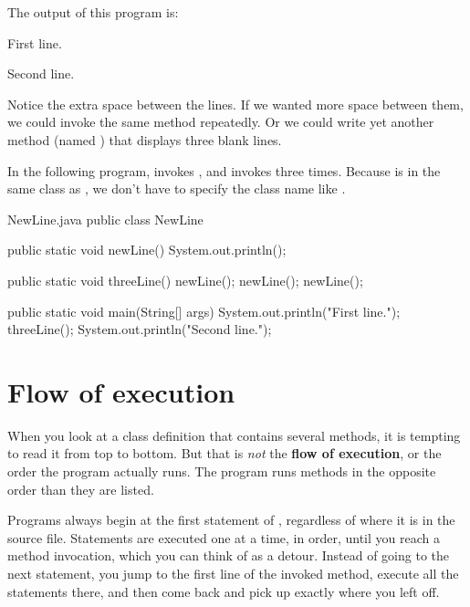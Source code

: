 The output of this program is:

\begin{stdout}
First line.

Second line.
\end{stdout}

Notice the extra space between the lines.
If we wanted more space between them, we could invoke the same method repeatedly.
Or we could write yet another method (named ) that displays three blank lines.

In the following program,  invokes , and  invokes  three times.
Because  is in the same class as , we don't have to specify the class name like .

\begin{trinket} [320]{NewLine.java}
public class NewLine {

    public static void newLine() {
        System.out.println();
    }

    public static void threeLine() {
        newLine();
        newLine();
        newLine();
    }

    public static void main(String[] args) {
        System.out.println("First line.");
        threeLine();
        System.out.println("Second line.");
    }
}
\end{trinket}


\section{Flow of execution}


When you look at a class definition that contains several methods, it is tempting to read it from top to bottom.
But that is {\em not} the {\bf flow of execution}, or the order the program actually runs.
The  program runs methods in the opposite order than they are listed.

Programs always begin at the first statement of , regardless of where it is in the source file.
Statements are executed one at a time, in order, until you reach a method invocation, which you can think of as a detour.
Instead of going to the next statement, you jump to the first line of the invoked method, execute all the statements there, and then come back and pick up exactly where you left off.

